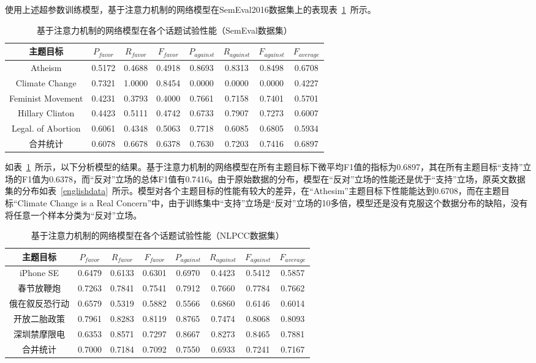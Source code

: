 使用上述超参数训练模型，基于注意力机制的网络模型在SemEval2016数据集上的表现表~\ref{a_bi_gru_cnn_semeval}~所示。
\begin{table}[htbp]
	\caption[table123]{基于注意力机制的网络模型在各个话题试验性能（SemEval数据集）}
	\label{a_bi_gru_cnn_semeval}
	\vspace{0.5em}\centering\wuhao
	\begin{tabular}{cccccccc}
		\toprule[1.5pt]
		主题目标& $P_{favor}$&$R_{favor}$&$F_{favor}$&$P_{against}$&$R_{against}$&$F_{against}$&$F_{average}$ \\
		\midrule[1pt]
	Atheism&0.5172&0.4688&0.4918&0.8693&0.8313&0.8498&0.6708\\
	Climate Change&0.7321&1.0000&0.8454&0.0000&0.0000&0.0000&0.4227\\
	Feminist Movement&0.4231&0.3793&0.4000&0.7661&0.7158&0.7401&0.5701\\
	Hillary Clinton&0.4423&0.5111&0.4742&0.6733&0.7907&0.7273&0.6007\\
	Legal. of Abortion&0.6061&0.4348&0.5063&0.7718&0.6085&0.6805&0.5934\\
	合并统计&0.6078&0.6678&0.6378&0.7630&0.7203&0.7416&0.6897\\
		\bottomrule[1.5pt]
	\end{tabular}
\end{table}

如表~\ref{a_bi_gru_cnn_semeval}~所示，以下分析模型的结果。基于注意力机制的网络模型在所有主题目标下微平均F1值的指标为0.6897，其在所有主题目标“支持”立场的F1值为0.6378，而“反对”立场的总体F1值有0.7416。由于原始数据的分布，模型在“反对”立场的性能还是优于“支持”立场，原英文数据集的分布如表~\ref{englishdata}~所示。模型对各个主题目标的性能有较大的差异，在“Athesim”主题目标下性能能达到0.6708，而在主题目标“Climate Change is a Real Concern”中，由于训练集中“支持”立场是“反对”立场的10多倍，模型还是没有克服这个数据分布的缺陷，没有将任意一个样本分类为“反对”立场。

\begin{table}[htbp]
	\caption[table123]{基于注意力机制的网络模型在各个话题试验性能（NLPCC数据集）}
	\label{chinese_a_bi_gru_cnn_semeval}
	\vspace{0.5em}\centering\wuhao
	\begin{tabular}{cccccccc}
		\toprule[1.5pt]
		主题目标& $P_{favor}$&$R_{favor}$&$F_{favor}$&$P_{against}$&$R_{against}$&$F_{against}$&$F_{average}$ \\
		\midrule[1pt]
		iPhone SE&0.6479&0.6133&0.6301&0.6970&0.4423&0.5412&0.5857\\
		春节放鞭炮&0.7263&0.7841&0.7541&0.7912&0.7660&0.7784&0.7662\\
		俄在叙反恐行动&0.6579&0.5319&0.5882&0.5566&0.6860&0.6146&0.6014\\
		开放二胎政策&0.7961&0.8283&0.8119&0.8765&0.7474&0.8068&0.8093\\
		深圳禁摩限电&0.6353&0.8571&0.7297&0.8667&0.8273&0.8465&0.7881\\
		合并统计&0.7000&0.7184&0.7092&0.7550&0.6933&0.7241&0.7167\\
		\bottomrule[1.5pt]
	\end{tabular}
\end{table}

